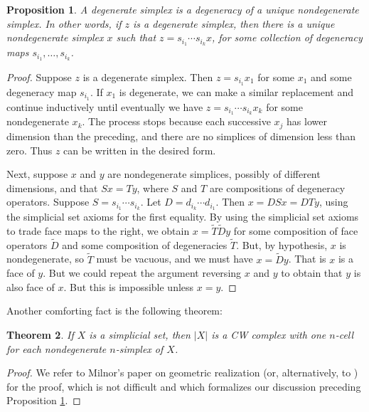 \documentclass[12pt]{article}
\theoremstyle{plain}
\newtheorem{theorem}{Theorem}[section]
\newtheorem{proposition}[theorem]{Proposition}
\theoremstyle{definition}
\theoremstyle{remark}
\newcommand{\td}[1]{\tilde{#1}}
\begin{document}
\begin{proposition}\label{P: unique deg}
A degenerate simplex is a degeneracy of a unique nondegenerate simplex. In other words, if $z$ is a degenerate simplex, then there is a unique nondegenerate simplex $x$ such that $z=s_{i_1}\cdots s_{i_k}x$, for some collection of degeneracy maps $s_{i_1},\ldots, s_{i_k}$. 
\end{proposition}
\begin{proof}

Suppose  $z$ is a degenerate simplex. Then $z=s_{i_1}x_1$ for some $x_1$ and some degeneracy map $s_{i_1}$. If $x_1$ is degenerate, we can make a similar replacement and  continue inductively until eventually we have  $z=s_{i_1}\cdots s_{i_k}x_k$ for some nondegenerate $x_k$. The process stops because each successive $x_j$ has lower dimension than the preceding, and there are no simplices of dimension less than zero. Thus $z$ can be written in the desired form.

Next, suppose $x$ and $y$ are nondegenerate simplices, possibly of different dimensions, and that $Sx=Ty$, where $S$ and $T$ are compositions of degeneracy operators.  Suppose $S=s_{i_1}\cdots s_{i_k}$. Let $D=d_{i_k}\cdots d_{i_1}$. Then $x=DSx=DTy$, using the simplicial set axioms for the first equality. By using the simplicial set axioms to trade face maps to the right, we obtain $x=\td T\td D y$ for some composition of face operators $\td D$ and some composition of degeneracies $\td T$. But, by hypothesis, $x$ is nondegenerate, so $\td T$ must be vacuous, and we must have $x=\td Dy$. That is $x$ is a face of $y$. But we could repeat the argument reversing $x$ and $y$ to obtain that $y$ is also face of $x$. But this is impossible unless $x=y$.  
\end{proof}



Another comforting fact is the following theorem:

\begin{theorem}\label{T: CW}
If $X$ is a simplicial set, then $|X|$ is a CW complex with one $n$-cell for each nondegenerate $n$-simplex of $X$. 
\end{theorem}
\begin{proof}
 We refer to Milnor's paper on geometric realization \cite{Mi57} (or, alternatively, to \cite[Theorem 14.1]{MAY67}) for the proof, which is not difficult and which formalizes our discussion preceding Proposition \ref{P: unique deg}.
\end{proof}
\end{document}
